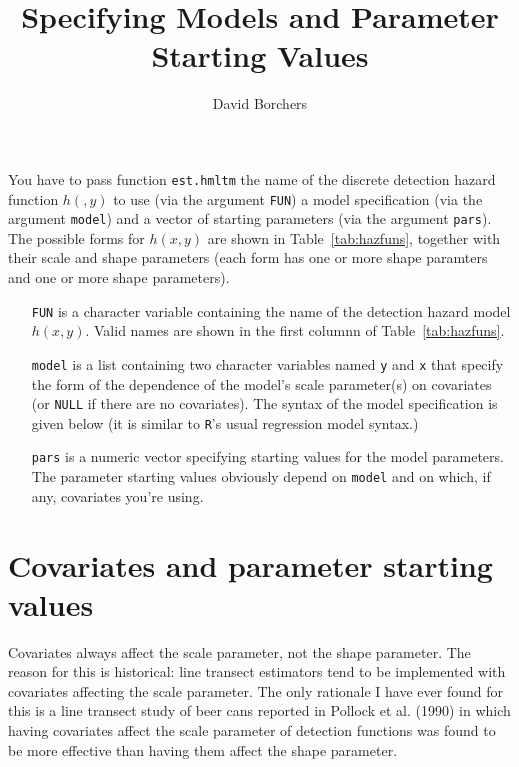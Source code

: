 \documentclass{article}
\title{Specifying Models and Parameter Starting Values}
\author{David Borchers}
\begin{document}
\maketitle



You have to pass function \verb|est.hmltm| the name of the discrete detection hazard function $h(,y)$ to use (via the argument \verb|FUN|) a model specification (via the argument \verb|model|) and a vector of starting parameters (via the argument \verb|pars|). The possible forms for $h(x,y)$ are shown in Table~\ref{tab:hazfuns}, together with their scale and shape parameters (each form has one or more shape paramters and one or more shape parameters). 

\begin{itemize}
\item[{\tt FUN}] is a character variable containing the name of the detection hazard model $h(x,y)$. Valid names are shown in the first columnn of Table~\ref{tab:hazfuns}.
\item[{\tt model}] is a list containing two character variables named \verb|y| and \verb|x| that specify the form of the dependence of the model's scale parameter(s) on covariates (or \verb|NULL| if there are no covariates). The syntax of the model specification is given below (it is similar to \verb|R|'s usual regression model syntax.)
\item[{\tt pars}] is a numeric vector specifying starting values for the model parameters. The parameter starting values obviously depend on \verb|model| and on which, if any, covariates you're using. 
\end{itemize}

\section{Covariates and parameter starting values}

Covariates always affect the scale parameter, not the shape parameter. The reason for this is historical: line transect estimators tend to be implemented with covariates affecting the scale parameter. The only rationale I have ever found for this is a line transect study of beer cans reported in Pollock et al. (1990) in which having covariates affect the scale parameter of detection functions was found to be more effective than having them affect the shape parameter.
\end{document}
